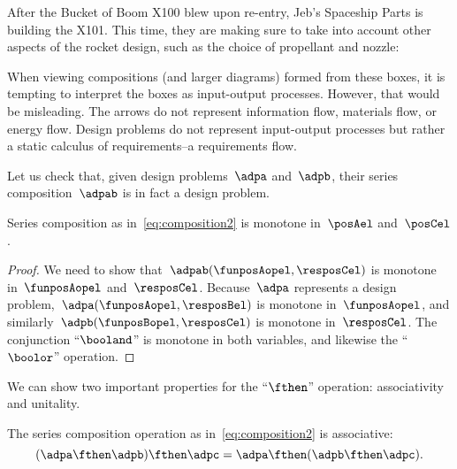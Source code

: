 \begin{example}
    After the Bucket of Boom X100 blew upon re-entry, Jeb's Spaceship Parts is building the X101.
    This time, they are making sure to take into account other aspects of the rocket design, such as the choice of propellant and nozzle:
\end{example}

\begin{remark}
    When viewing compositions (and larger diagrams) formed from these boxes, it is tempting to interpret the boxes as input-output processes.
    However, that would be misleading.
    The arrows do not represent information flow, materials flow, or energy flow.
    Design problems do not represent input-output processes but rather a static calculus of requirements--a requirements flow.
\end{remark}

Let us check that, given design problems~$\adpa$ and~$\adpb$, their series composition~$\adpab$ is in fact a design problem.
\begin{lemma}
    Series composition as in~\cref{eq:composition2} is monotone in~$\posAel$ and~$\posCel$.
\end{lemma}
\begin{proof}
    We need to show that~$\adpab(\funposAopel,\resposCel)$ is monotone in~$\funposAopel$ and~$\resposCel$.
    Because~$\adpa$ represents a design problem,~$\adpa(\funposAopel,\resposBel)$ is monotone in~$\funposAopel$, and similarly~$\adpb(\funposBopel,\resposCel)$ is monotone in~$\resposCel$.
    The conjunction ``$\booland$'' is monotone in both variables, and likewise the ``$\boolor$'' operation.
\end{proof}

We can show two important properties for the ``$\fthen$'' operation: associativity and unitality.
\begin{lemma}
    The series composition operation as in~\cref{eq:composition2} is associative:
    \begin{equation}
        (\adpa\fthen \adpb)
        \fthen \adpc = \adpa\fthen (\adpb\fthen \adpc).
    \end{equation}
\end{lemma}

